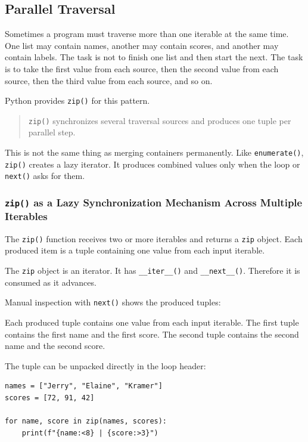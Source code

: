 \subsection{Parallel Traversal}

Sometimes a program must traverse more than one iterable at the same time. One list may contain names, another may contain scores, and another may contain labels. The task is not to finish one list and then start the next. The task is to take the first value from each source, then the second value from each source, then the third value from each source, and so on.

Python provides \texttt{zip()} for this pattern.

\begin{quote}
\texttt{zip()} synchronizes several traversal sources and produces one tuple per parallel step.
\end{quote}

This is not the same thing as merging containers permanently. Like \texttt{enumerate()}, \texttt{zip()} creates a lazy iterator. It produces combined values only when the loop or \texttt{next()} asks for them.

\subsubsection{\texttt{zip()} as a Lazy Synchronization Mechanism Across Multiple Iterables}

The \texttt{zip()} function receives two or more iterables and returns a \texttt{zip} object. Each produced item is a tuple containing one value from each input iterable.

The \texttt{zip} object is an iterator. It has \texttt{\_\_iter\_\_()} and \texttt{\_\_next\_\_()}. Therefore it is consumed as it advances.

Manual inspection with \texttt{next()} shows the produced tuples:

Each produced tuple contains one value from each input iterable. The first tuple contains the first name and the first score. The second tuple contains the second name and the second score.

The tuple can be unpacked directly in the loop header:

\begin{verbatim}
names = ["Jerry", "Elaine", "Kramer"]
scores = [72, 91, 42]

for name, score in zip(names, scores):
    print(f"{name:<8} | {score:>3}")
\end{verbatim}

